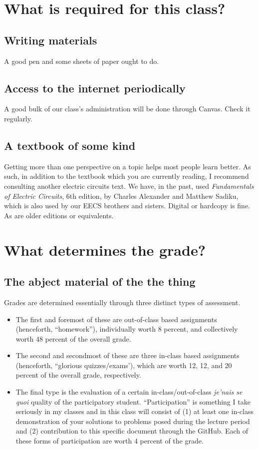 \documentclass[11pt]{book}
\begin{document}
\section{What is required for this class?}
\subsection{Writing materials}
A good pen and some sheets of paper ought to do.

\subsection{Access to the internet periodically}
A good bulk of our class’s administration will be done through Canvas. Check it regularly.

\subsection{A textbook of some kind}
Getting more than one perspective on a topic helps most people learn better. As such, in addition to the textbook which you are currently reading, I recommend consulting another electric circuits text. We have, in the past, used \textit{Fundamentals of Electric Circuits}, 6th edition, by Charles Alexander and Matthew Sadiku, which is also used by our EECS brothers and sisters. Digital or hardcopy is fine. As are older editions or equivalents.

\section{What determines the grade?}
\subsection{The abject material of the the thing}
Grades are determined essentially through three distinct types of assessment. 
\begin{itemize}
	\item The first and foremost of these are out-of-class based assignments (henceforth, ``homework''), individually worth 8 percent, and collectively worth 48 percent of the overall grade.
	\item The second and secondmost of these are three in-class based assignments (henceforth, ``glorious quizzes/exams'), which are worth 12, 12, and 20 percent of the overall grade, respectively. 
	\item The final type is the evaluation of a certain in-class/out-of-class \textit{je’nais se quoi} quality of the participatory student. ``Participation'' is something I take seriously in my classes and in this class will consist of (1) at least one in-class demonstration of your solutions to problems posed during the lecture period and (2) contribution to this specific document through the GitHub. Each of these forms of participation are worth 4 percent of the grade.
\end{itemize}
\end{document}
